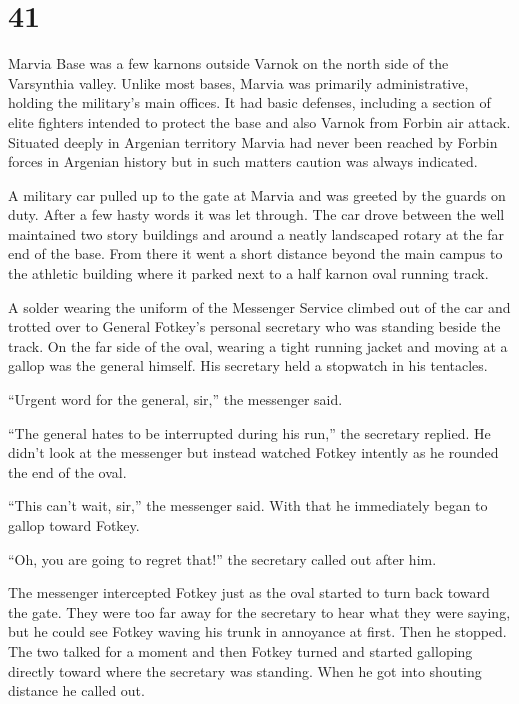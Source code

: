 
\chapter{41}

Marvia Base was a few karnons outside Varnok on the north side of the Varsynthia valley. Unlike
most bases, Marvia was primarily administrative, holding the military's main offices. It had
basic defenses, including a section of elite fighters intended to protect the base and also
Varnok from Forbin air attack. Situated deeply in Argenian territory Marvia had never been
reached by Forbin forces in Argenian history but in such matters caution was always indicated.

A military car pulled up to the gate at Marvia and was greeted by the guards on duty. After a
few hasty words it was let through. The car drove between the well maintained two story
buildings and around a neatly landscaped rotary at the far end of the base. From there it went a
short distance beyond the main campus to the athletic building where it parked next to a half
karnon oval running track.

A solder wearing the uniform of the Messenger Service climbed out of the car and trotted over to
General Fotkey's personal secretary who was standing beside the track. On the far side of the
oval, wearing a tight running jacket and moving at a gallop was the general himself. His
secretary held a stopwatch in his tentacles.

``Urgent word for the general, sir,'' the messenger said.

``The general hates to be interrupted during his run,'' the secretary replied. He didn't look at
the messenger but instead watched Fotkey intently as he rounded the end of the oval.

``This can't wait, sir,'' the messenger said. With that he immediately began to gallop toward
Fotkey.

``Oh, you are going to regret that!'' the secretary called out after him.

The messenger intercepted Fotkey just as the oval started to turn back toward the gate. They
were too far away for the secretary to hear what they were saying, but he could see Fotkey
waving his trunk in annoyance at first. Then he stopped. The two talked for a moment and then
Fotkey turned and started galloping directly toward where the secretary was standing. When he
got into shouting distance he called out.

